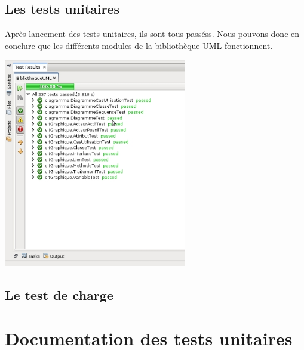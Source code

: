 \documentclass[12pt,a4paper,openany]{report}
\begin{document}
	\section{Les tests unitaires}
	Après lancement des tests unitaires, ils sont tous passéss. Nous pouvons donc en conclure que les différents modules de la bibliothèque UML fonctionnent. 
	\begin{center} \includegraphics[width=8cm]{junitPassed.jpg} \end{center}
	\section{Le test de charge}
	\appendix	
	\chapter{Documentation des tests unitaires}
	\label{junitdoc}
	
\end{document}
